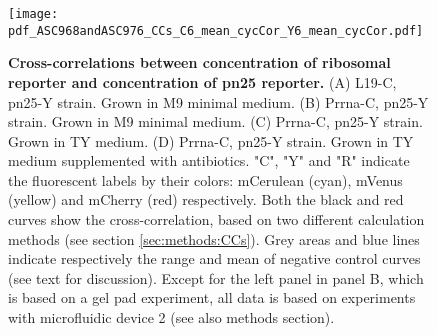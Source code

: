 
\begin{figure}
    \centering
    \texttt{[image: pdf\_ASC968andASC976\_CCs\_C6\_mean\_cycCor\_Y6\_mean\_cycCor.pdf]}
    \caption{ 
        \textbf{Cross-correlations between concentration of ribosomal reporter and concentration of pn25 reporter.}
        (A) L19-C, pn25-Y strain. Grown in M9 minimal medium.
        (B) Prrna-C, pn25-Y strain. Grown in M9 minimal medium.        
        (C) Prrna-C, pn25-Y strain. Grown in TY medium.
        (D) Prrna-C, pn25-Y strain. Grown in TY medium supplemented with antibiotics.
        "C", "Y" and "R" indicate the fluorescent labels by their colors: mCerulean (cyan), mVenus (yellow) and mCherry (red) respectively.
        Both the black and red curves show the cross-correlation, based on two different calculation methods (see section \ref{sec:methods:CCs}).
        Grey areas and blue lines indicate respectively the range and mean of negative control curves (see text for discussion).
        Except for the left panel in panel B, which is based on a gel pad experiment, all data is based on experiments with microfluidic device 2 (see also methods section).
    }
    \label{fig:ribo:CCsEERiboPn25}
\end{figure}

